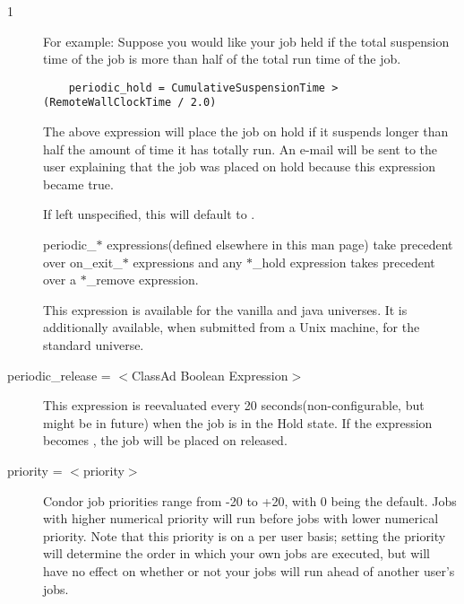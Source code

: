 \begin{ManPage}{\label{man-condor-submit}}{1}
\begin{description}
For example:
Suppose you would like your job held if the total suspension time of the
job is more than half of the total run time of the job.

\begin{verbatim}
	periodic_hold = CumulativeSuspensionTime > (RemoteWallClockTime / 2.0)
\end{verbatim}

The above expression will place the job on hold if it suspends longer
than half the amount of time it has totally run.  An e-mail will be
sent to the user explaining that the job was placed on hold because this
expression became true.

If left unspecified, this will default to .

periodic\_$*$ expressions(defined elsewhere in this man page) take
precedent over on\_exit\_$*$ expressions and any $*$\_hold expression takes
precedent over a $*$\_remove expression.

This expression is available for the vanilla and java universes.
It is additionally available, when submitted from a Unix machine,
for the standard universe.


\item[periodic\_release = $<$ClassAd Boolean Expression$>$] This expression
is reevaluated every 20 seconds(non-configurable, but might be in future)
when the job is in the Hold state.
If the expression becomes , the job will be placed on released.

%



\item[priority = $<$priority$>$] Condor job priorities range from -20 to
+20, with 0 being the default. Jobs with higher numerical priority will
run before jobs with lower numerical priority. Note that this priority
is on a per user basis; setting the priority will determine the order in
which your own jobs are executed, but will have no effect on whether or
not your jobs will run ahead of another user's jobs. 


\end{description}
\end{ManPage}
